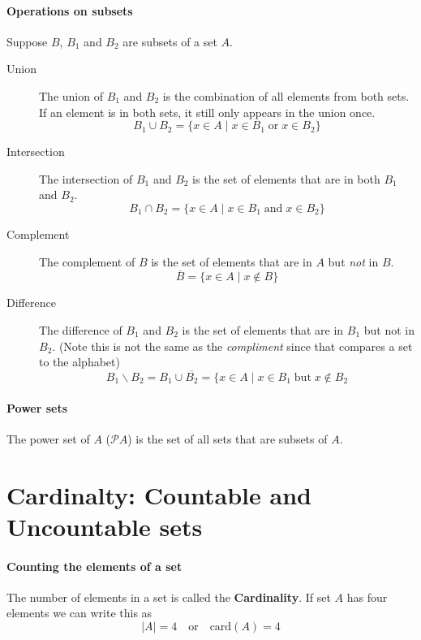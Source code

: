 \documentclass{article}
\begin{document}
\paragraph{Operations on subsets} Suppose $B$, $B_1$ and $B_2$ are subsets of a set $A$.
\begin{description}
\item [Union] The union of $B_1$ and $B_2$ is the combination of all elements from both sets. If an element is in both sets, it still only appears in the union once.
$$B_1 \cup B_2 = \{x\in A\; |\; x\in B_1\; \text{or}\; x\in B_2\}$$
\item [Intersection] The intersection of $B_1$ and $B_2$ is the set of elements that are in both $B_1$ and $B_2$.
$$B_1 \cap B_2 = \{x\in A\; |\; x\in B_1\; \text{and}\; x\in B_2\}$$
\item [Complement] The complement of $B$ is the set of elements that are in $A$ but \textit{not} in $B$.
$$\overline{B}=\{x\in A\; |\; x\notin B\}$$
\item [Difference] The difference of $B_1$ and $B_2$ is the set of elements that are in $B_1$ but not in $B_2$. (Note this is not the same as the \textit{compliment} since that compares a set to the alphabet)
$$B_1 \backslash B_2=B_1 \cup \overline{B_2}=\{ x\in A\; |\; x\in B_1\; \text{but}\; x\notin B_2$$
\end{description}

\paragraph{Power sets} The power set of $A$ ($\mathscr{P} A$) is the set of all sets that are subsets of $A$.

\section{Cardinalty: Countable and Uncountable sets}
\paragraph{Counting the elements of a set} The number of elements in a set is called the \textbf{Cardinality}. If set $A$ has four elements we can write this as
$$|A|=4\quad \text{or}\quad \text{card}(A)=4$$
\end{document}
